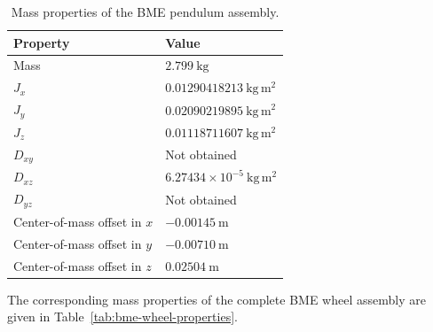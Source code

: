\begin{table}[htbp]
  \centering
  \small
  \renewcommand{\arraystretch}{1.3}
  \caption{Mass properties of the BME pendulum assembly.}
  \label{tab:bme-pendulum-properties}
  \begin{tabular}{
    p{}
    p{}
  }
    \hline
    \textbf{Property}
    &
    \textbf{Value}
    \\
    \hline

    Mass
    &
    $2.799~\mathrm{kg}$
    \\

    $J_x$
    &
    $0.01290418213~\mathrm{kg\,m^2}$
    \\

    $J_y$
    &
    $0.02090219895~\mathrm{kg\,m^2}$
    \\

    $J_z$
    &
    $0.01118711607~\mathrm{kg\,m^2}$
    \\

    $D_{xy}$
    &
    Not obtained
    \\

    $D_{xz}$
    &
    $6.27434\times10^{-5}~\mathrm{kg\,m^2}$
    \\

    $D_{yz}$
    &
    Not obtained
    \\

    Center-of-mass offset in $x$
    &
    $-0.00145~\mathrm{m}$
    \\

    Center-of-mass offset in $y$
    &
    $-0.00710~\mathrm{m}$
    \\

    Center-of-mass offset in $z$
    &
    $0.02504~\mathrm{m}$
    \\

    \hline
  \end{tabular}
\end{table}

The corresponding mass properties of the complete BME wheel assembly are given in Table~\ref{tab:bme-wheel-properties}.

